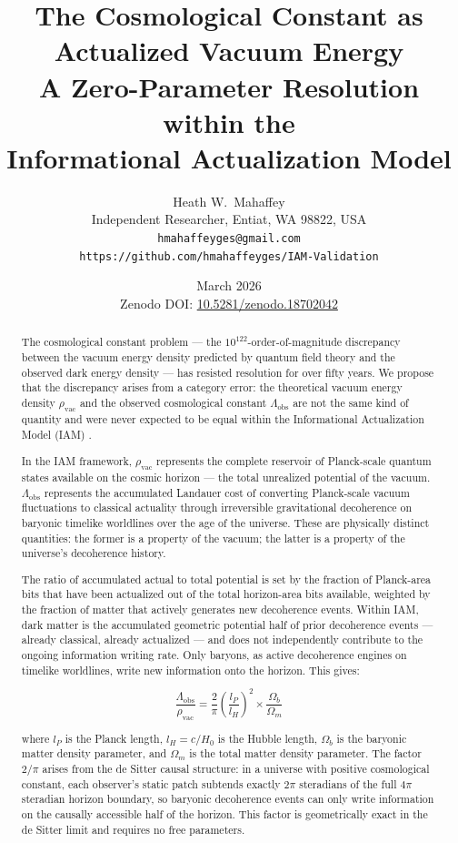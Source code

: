 \documentclass[12pt,a4paper]{article}
\title{\textbf{The Cosmological Constant as Actualized Vacuum Energy}\\
\large A Zero-Parameter Resolution within the\\
Informational Actualization Model}
\author{Heath W.\ Mahaffey\\
\small Independent Researcher, Entiat, WA 98822, USA\\
\small \texttt{hmahaffeyges@gmail.com}\\
\small \texttt{https://github.com/hmahaffeyges/IAM-Validation}}
\date{March 2026\\
\small Zenodo DOI:
\href{https://doi.org/10.5281/zenodo.18702042}{10.5281/zenodo.18702042}}
\begin{document}
\maketitle

\begin{abstract}
The cosmological constant problem — the $10^{122}$-order-of-magnitude
discrepancy between the vacuum energy density predicted by quantum field
theory and the observed dark energy density — has resisted resolution for
over fifty years. We propose that the discrepancy arises from a category
error: the theoretical vacuum energy density $\rho_\mathrm{vac}$ and the
observed cosmological constant $\Lambda_\mathrm{obs}$ are not the same
kind of quantity and were never expected to be equal within the
Informational Actualization Model (IAM) \citep{mahaffey2026}.

In the IAM framework, $\rho_\mathrm{vac}$ represents the complete
reservoir of Planck-scale quantum states available on the cosmic horizon
— the total unrealized potential of the vacuum. $\Lambda_\mathrm{obs}$
represents the accumulated Landauer cost of converting Planck-scale
vacuum fluctuations to classical actuality through irreversible
gravitational decoherence on baryonic timelike worldlines over the age of
the universe. These are physically distinct quantities: the former is a
property of the vacuum; the latter is a property of the universe's
decoherence history.

The ratio of accumulated actual to total potential is set by the fraction
of Planck-area bits that have been actualized out of the total
horizon-area bits available, weighted by the fraction of matter that
actively generates new decoherence events. Within IAM, dark matter is
the accumulated geometric potential half of prior decoherence events —
already classical, already actualized — and does not independently
contribute to the ongoing information writing rate. Only baryons, as
active decoherence engines on timelike worldlines, write new information
onto the horizon. This gives:

\begin{equation}
\frac{\Lambda_\mathrm{obs}}{\rho_\mathrm{vac}} =
\frac{2}{\pi}\left(\frac{l_P}{l_H}\right)^2 \times \frac{\Omega_b}{\Omega_m}
\label{eq:main}
\end{equation}

where $l_P$ is the Planck length, $l_H = c/H_0$ is the Hubble length,
$\Omega_b$ is the baryonic matter density parameter, and $\Omega_m$ is
the total matter density parameter. The factor $2/\pi$ arises from the
de Sitter causal structure: in a universe with positive cosmological
constant, each observer's static patch subtends exactly $2\pi$ steradians
of the full $4\pi$ steradian horizon boundary, so baryonic decoherence
events can only write information on the causally accessible half of the
horizon. This factor is geometrically exact in the de Sitter limit and
requires no free parameters.


\end{abstract}
\end{document}

